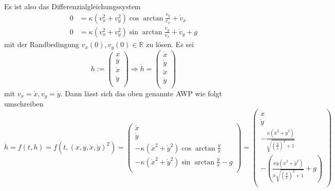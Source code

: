 \documentclass[a4paper,11pt]{article}
\theoremstyle{mytheor}
\renewcommand{\implies}{\Rightarrow}
\begin{document}
Es ist also das Differenzialgleichungssystem
\begin{align*}
    0 & = \kappa (v_x^2 + v_y^2) \cos \arctan \frac{v_y}{v_x} + \dot{v}_x     \\
    0 & = \kappa (v_x^2 + v_y^2) \sin \arctan \frac{v_y}{v_x} + \dot{v}_y + g
\end{align*}
mit der Randbedingung $v_x(0), v_y(0) \in \mathbb{R}$ zu lösen.
Es sei $$h := \left(
    \begin{array}{c}
            x       \\
            y       \\
            \dot{x} \\
            \dot{y} \\
        \end{array}
    \right) \implies \dot{h} = \left(
    \begin{array}{c}
            \dot{x}  \\
            \dot{y}  \\
            \ddot{x} \\
            \ddot{y} \\
        \end{array}
    \right)$$
mit $v_x = \dot{x}, v_y = \dot{y}$. Dann lässt sich das oben genannte AWP wie folgt umschreiben
$$
    \dot{h} = f(t,h) = f(t, (x, y, \dot{x}, \dot{y})^T) = \left( \begin{array}{c}
            \dot{x}                                                                 \\
            \dot{y}                                                                 \\
            -\kappa(\dot{x}^2 + \dot{y}^2) \cos \arctan \frac{\dot{y}}{\dot{x}}     \\
            -\kappa(\dot{x}^2 + \dot{y}^2) \sin \arctan \frac{\dot{y}}{\dot{x}} - g \\
        \end{array} \right) = \left( \begin{array}{c}
            \dot{x}                                                                                            \\
            \dot{y}                                                                                            \\
            -\frac{\kappa(\dot{x}^2 + \dot{y}^2)}{\sqrt{(\frac{\dot{y}}{\dot{x}})^2+1}}                        \\
            -(\frac{\kappa \dot{y} (\dot{x}^2 + \dot{y}^2)}{\dot{x} \sqrt{(\frac{\dot{y}}{\dot{x}})^2+1}} + g) \\
        \end{array} \right)
$$
\end{document}
